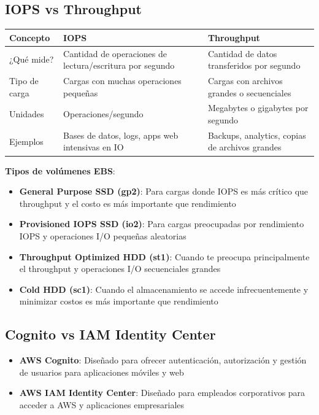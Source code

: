 \documentclass[12pt,a4paper]{report}
\begin{document}
\subsection{IOPS vs Throughput}

\begin{center}
\begin{longtable}{|p{2.5cm}|p{5.5cm}|p{5.5cm}|}
\hline
\cellcolor{awsblue!20}\textbf{Concepto} & \cellcolor{awsblue!20}\textbf{IOPS} & \cellcolor{awsblue!20}\textbf{Throughput} \\
\hline
¿Qué mide? & Cantidad de operaciones de lectura/escritura por segundo & Cantidad de datos transferidos por segundo \\
\hline
Tipo de carga & Cargas con muchas operaciones pequeñas & Cargas con archivos grandes o secuenciales \\
\hline
Unidades & Operaciones/segundo & Megabytes o gigabytes por segundo \\
\hline
Ejemplos & Bases de datos, logs, apps web intensivas en IO & Backups, analytics, copias de archivos grandes \\
\hline
\end{longtable}
\end{center}

\textbf{Tipos de volúmenes EBS}:
\begin{itemize}
    \item \textbf{General Purpose SSD (gp2)}: Para cargas donde IOPS es más crítico que throughput y el costo es más importante que rendimiento
    \item \textbf{Provisioned IOPS SSD (io2)}: Para cargas preocupadas por rendimiento IOPS y operaciones I/O pequeñas aleatorias
    \item \textbf{Throughput Optimized HDD (st1)}: Cuando te preocupa principalmente el throughput y operaciones I/O secuenciales grandes
    \item \textbf{Cold HDD (sc1)}: Cuando el almacenamiento se accede infrecuentemente y minimizar costos es más importante que rendimiento
\end{itemize}

\subsection{Cognito vs IAM Identity Center}

\begin{itemize}
    \item \textbf{AWS Cognito}: Diseñado para ofrecer autenticación, autorización y gestión de usuarios para aplicaciones móviles y web
    \item \textbf{AWS IAM Identity Center}: Diseñado para empleados corporativos para acceder a AWS y aplicaciones empresariales
\end{itemize}
\end{document}
